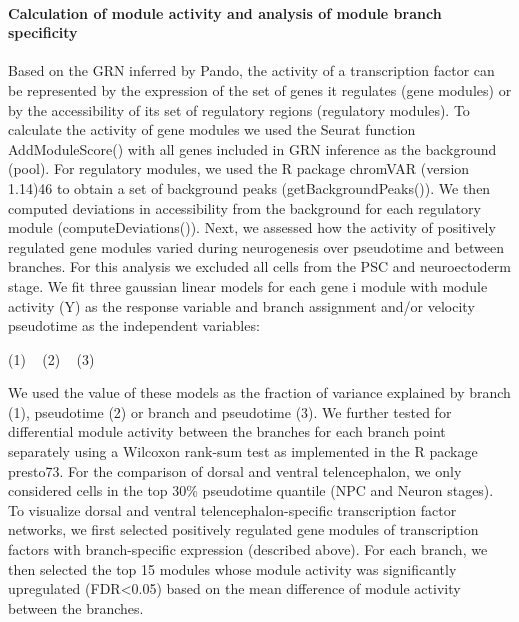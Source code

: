 \paragraph{Calculation of module activity and analysis of module branch specificity}
Based on the GRN inferred by Pando, the activity of a transcription factor can be represented by the expression of the set of genes it regulates (gene modules) or by the accessibility of its set of regulatory regions (regulatory modules). To calculate the activity of gene modules we used the Seurat function AddModuleScore() with all genes included in GRN inference as the background (pool). For regulatory modules, we used the R package chromVAR (version 1.14)46 to obtain a set of background peaks (getBackgroundPeaks()). We then computed deviations in accessibility from the background for each regulatory module (computeDeviations()). Next, we assessed how the activity of positively regulated gene modules varied during neurogenesis over pseudotime and between branches. For this analysis we excluded all cells from the PSC and neuroectoderm stage. We fit three gaussian linear models for each gene i module with module activity (Y) as the response variable and branch assignment and/or velocity pseudotime as the independent variables:
 
(1)   ~ 
(2)   ~ 
(3)   ~ 
 
We used the  value of these models as the fraction of variance explained by branch (1), pseudotime (2) or branch and pseudotime (3). We further tested for differential module activity between the branches for each branch point separately using a Wilcoxon rank-sum test as implemented in the R package presto73. For the comparison of dorsal and ventral telencephalon, we only considered cells in the top 30\% pseudotime quantile (NPC and Neuron stages).  To visualize dorsal and ventral telencephalon-specific transcription factor networks, we first selected positively regulated gene modules of transcription factors with branch-specific expression (described above). For each branch, we then selected the top 15 modules whose module activity was significantly upregulated (FDR<0.05) based on the mean difference of module activity between the branches.
                       
 

